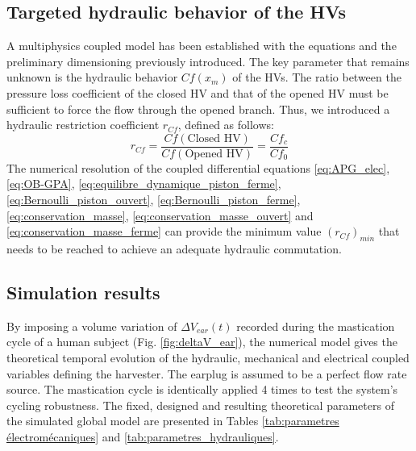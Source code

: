 \documentclass[3p,twocolumn,preprint]{elsarticle}
\begin{document}
	\subsection{Targeted hydraulic behavior of the HVs}	
	\label{subsec:HV hydraulic targeted behaviour}
A multiphysics coupled model has been established with the equations and the preliminary dimensioning previously introduced. The key parameter that remains unknown is the hydraulic behavior $Cf(x_m)$ of the HVs. The ratio between the pressure loss coefficient of the closed HV and that of the opened HV must be sufficient to force the flow through the opened branch. Thus, we introduced a hydraulic restriction coefficient $r_{Cf}$, defined as follows:
\begin{equation}
	r_{Cf} = \dfrac{Cf(\text{Closed HV})}{Cf(\text{Opened HV})}	= \dfrac{Cf_c}{Cf_0}	
	\label{eq:r_Cf_definition}
\end{equation}
The numerical resolution of the coupled differential equations \ref{eq:APG_elec},\ref{eq:OB-GPA}, \ref{eq:equilibre_dynamique_piston_ferme}, \ref{eq:Bernoulli_piston_ouvert}, \ref{eq:Bernoulli_piston_ferme}, \ref{eq:conservation_masse}, \ref{eq:conservation_masse_ouvert} and \ref{eq:conservation_masse_ferme} can provide the minimum value $(r_{Cf})_{min}$ that needs to be reached to achieve an adequate hydraulic commutation.
	\subsection{Simulation results}	
	\label{subsec:Simulation results}
By imposing a volume variation of $\Delta V_{ear}(t)$ recorded during the mastication cycle of a human subject (Fig. \ref{fig:deltaV_ear}), the numerical model gives the theoretical temporal evolution of the hydraulic, mechanical and electrical coupled variables defining the harvester. The earplug is assumed to be a perfect flow rate source. The mastication cycle is identically applied 4 times to test the system's cycling robustness. The fixed, designed and resulting theoretical parameters of the simulated global model are presented in Tables \ref{tab:parametres électromécaniques} and \ref{tab:parametres_hydrauliques}.
\end{document}
